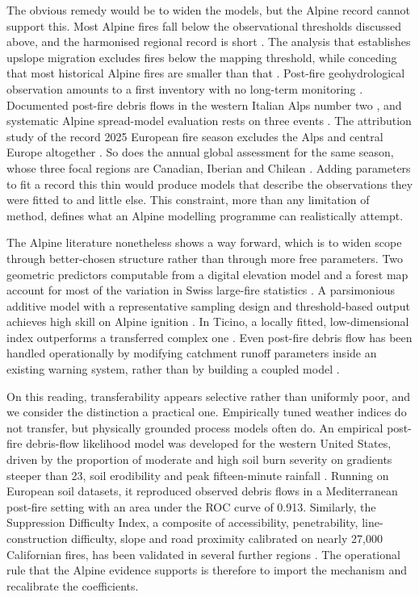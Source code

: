 \documentclass[11pt,a4paper]{article}
\begin{document}
The obvious remedy would be to widen the models, but the Alpine record cannot support this. Most Alpine fires fall below the observational thresholds discussed above, and the harmonised regional record is short \citep{conedera_characterizing_2018}. The analysis that establishes upslope migration excludes fires below the mapping threshold, while conceding that most historical Alpine fires are smaller than that \citep{beloiu_climatedriven_2026}. Post-fire geohydrological observation amounts to a first inventory with no long-term monitoring \citep{melzner_wildfire-induced_2025}. Documented post-fire debris flows in the western Italian Alps number two \citep{tiranti_wildfires_2021}, and systematic Alpine spread-model evaluation rests on three events \citep{malanchini_modeling_2025}. The attribution study of the record 2025 European fire season excludes the Alps and central Europe altogether \citep{keeping_attribution_2026}. So does the annual global assessment for the same season, whose three focal regions are Canadian, Iberian and Chilean \citep{burton_state_2026}. Adding parameters to fit a record this thin would produce models that describe the observations they were fitted to and little else. This constraint, more than any limitation of method, defines what an Alpine modelling programme can realistically attempt.

The Alpine literature nonetheless shows a way forward, which is to widen scope through better-chosen structure rather than through more free parameters. Two geometric predictors computable from a digital elevation model and a forest map account for most of the variation in Swiss large-fire statistics \citep{conedera_linking_2024}. A parsimonious additive model with a representative sampling design and threshold-based output achieves high skill on Alpine ignition \citep{moreno_1_nodate}. In Ticino, a locally fitted, low-dimensional index outperforms a transferred complex one \citep{de_angelis_modelling_2015}. Even post-fire debris flow has been handled operationally by modifying catchment runoff parameters inside an existing warning system, rather than by building a coupled model \citep{tiranti_wildfires_2021}.

On this reading, transferability appears selective rather than uniformly poor, and we consider the distinction a practical one. Empirically tuned weather indices do not transfer, but physically grounded process models often do. An empirical post-fire debris-flow likelihood model was developed for the western United States, driven by the proportion of moderate and high soil burn severity on gradients steeper than 23\degree{}, soil erodibility and peak fifteen-minute rainfall \citep{diakakis_exploring_2023}. Running on European soil datasets, it reproduced observed debris flows in a Mediterranean post-fire setting with an area under the ROC curve of 0.913. Similarly, the Suppression Difficulty Index, a composite of accessibility, penetrability, line-construction difficulty, slope and road proximity calibrated on nearly 27{,}000 Californian fires, has been validated in several further regions \citep{cardil_assessing_2025}. The operational rule that the Alpine evidence supports is therefore to import the mechanism and recalibrate the coefficients.
\end{document}
